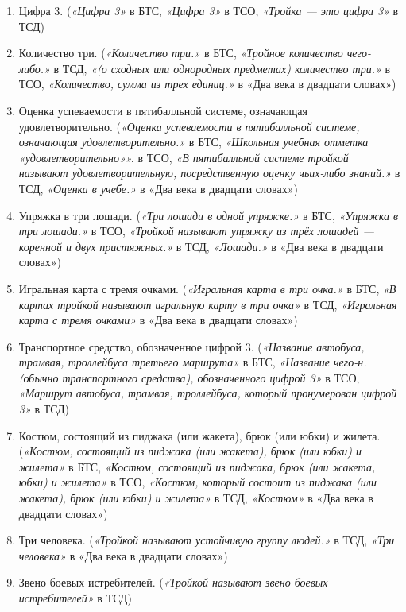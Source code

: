 \documentclass[LI,VKR]{HSEUniversity}
\begin{document}
\begin{enumerate}
    \item Цифра 3.
    (\textit{«Цифра 3»} в БТС,
    \textit{«Цифра 3»} в ТСО,
    \textit{«Тройка — это цифра 3»} в ТСД)

    \item Количество три.
    (\textit{«Количество три.»} в БТС,
    \textit{«Тройное количество чего-либо.»} в ТСД,
    \textit{«(о сходных или однородных предметах) количество три.»} в ТСО,
    \textit{«Количество, сумма из трех единиц.»} в «Два века в двадцати словах»)

    \item Оценка успеваемости в пятибалльной системе, означающая удовлетворительно.
    (\textit{«Оценка успеваемости в пятибалльной системе, означающая удовлетворительно.»} в БТС,
    \textit{«Школьная учебная отметка «удовлетворительно»».} в ТСО,
    \textit{«В пятибалльной системе тройкой называют удовлетворительную, посредственную оценку чьих-либо знаний.»} в ТСД,
    \textit{«Оценка в учебе.»} в «Два века в двадцати словах»)

    \item Упряжка в три лошади.
    (\textit{«Три лошади в одной упряжке.»} в БТС,
    \textit{«Упряжка в три лошади.»} в ТСО,
    \textit{«Тройкой называют упряжку из трёх лошадей — коренной и двух пристяжных.»} в ТСД,
    \textit{«Лошади.»} в «Два века в двадцати словах»)

    \item Игральная карта с тремя очками.
    (\textit{«Игральная карта в три очка.»} в БТС,
    \textit{«В картах тройкой называют игральную карту в три очка»} в ТСД,
    \textit{«Игральная карта с тремя очками»} в «Два века в двадцати словах»)

    \item Транспортное средство, обозначенное цифрой 3.
    (\textit{«Название автобуса, трамвая, троллейбуса третьего маршрута»} в БТС,
    \textit{«Название чего-н. (обычно транспортного средства), обозначенного цифрой 3»} в ТСО,
    \textit{«Маршрут автобуса, трамвая, троллейбуса, который пронумерован цифрой 3»} в ТСД)

    \item Костюм, состоящий из пиджака (или жакета), брюк (или юбки) и жилета.
    (\textit{«Костюм, состоящий из пиджака (или жакета), брюк (или юбки) и жилета»} в БТС,
    \textit{«Костюм, состоящий из пиджака, брюк (или жакета, юбки) и жилета»} в ТСО,
    \textit{«Костюм, который состоит из пиджака (или жакета), брюк (или юбки) и жилета»} в ТСД,
    \textit{«Костюм»} в «Два века в двадцати словах»)

    \item Три человека.
    (\textit{«Тройкой называют устойчивую группу людей.»} в ТСД,
    \textit{«Три человека»} в «Два века в двадцати словах»)

    \item Звено боевых истребителей.
    (\textit{«Тройкой называют звено боевых истребителей»} в ТСД)
\end{enumerate}
\end{document}
